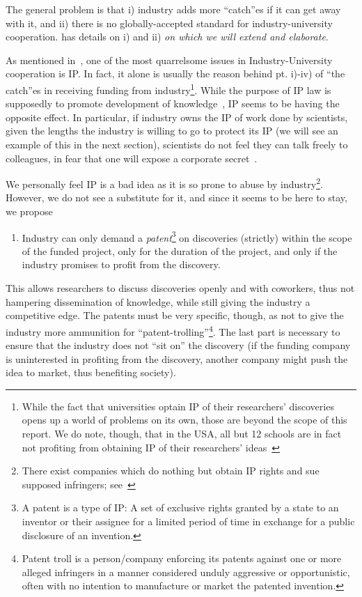 \documentclass[draft,11pt,openright,monochrome,british,a4paper]{scrartcl}
\begin{document}
The general problem is that i) industry adds more ``catch''es if it
can get away with it, and ii) there is no globally-accepted standard
for industry-university cooperation. \cite{washburn2001} has details
on i) and ii) \emph{on which we will extend and elaborate}.

As mentioned in~\cite{pain2008}, one of the most quarrelsome issues in
Industry-University cooperation is IP. In fact, it alone is usually
the reason behind pt. i)-iv) of ``the catch''es in receiving funding
from industry\footnote{While the fact that universities optain IP of
  their researchers' discoveries opens up a world of problems on its
  own, those are beyond the scope of this report. We do note, though,
  that in the USA, all but 12 schools are in fact not profiting from
  obtaining IP of their researchers' ideas~\cite{washburn2006}}. While
the purpose of IP law is supposedly to promote development of
knowledge~\cite{alger2001}, IP seems to be having the opposite
effect. In particular, if industry owns the IP of work done by
scientists, given the lengths the industry is willing to go to protect
its IP (we will see an example of this in the next section),
scientists do not feel they can talk freely to colleagues, in fear
that one will expose a corporate secret~\cite{washburn2001}.

We personally feel IP is a bad idea as it is so prone to abuse by
industry\footnote{There exist companies which do nothing but obtain IP
  rights and sue supposed infringers; see~\cite{sco}}. However, we do
not see a substitute for it, and since it seems to be here to stay, we
propose
\begin{enumerate}
\item[1.] Industry can only demand a \emph{patent}\footnote{A patent
    is a type of IP: A set of exclusive rights granted by a state to
    an inventor or their assignee for a limited period of time in
    exchange for a public disclosure of an invention.} on discoveries
  (strictly) within the scope of the funded project, only for the
  duration of the project, and only if the industry promises to profit
  from the discovery.
\end{enumerate}
This allows researchers to discuss discoveries openly and with
coworkers, thus not hampering dissemination of knowledge, while still
giving the industry a competitive edge. The patents must be very
specific, though, as not to give the industry more ammunition for
``patent-trolling''\footnote{Patent troll is a person/company
  enforcing its patents against one or more alleged infringers in a
  manner considered unduly aggressive or opportunistic, often with no
  intention to manufacture or market the patented invention.}. The
last part is necessary to ensure that the industry does not ``sit on''
the discovery (if the funding company is uninterested in profiting
from the discovery, another company might push the idea to market,
thus benefiting society).
\end{document}
